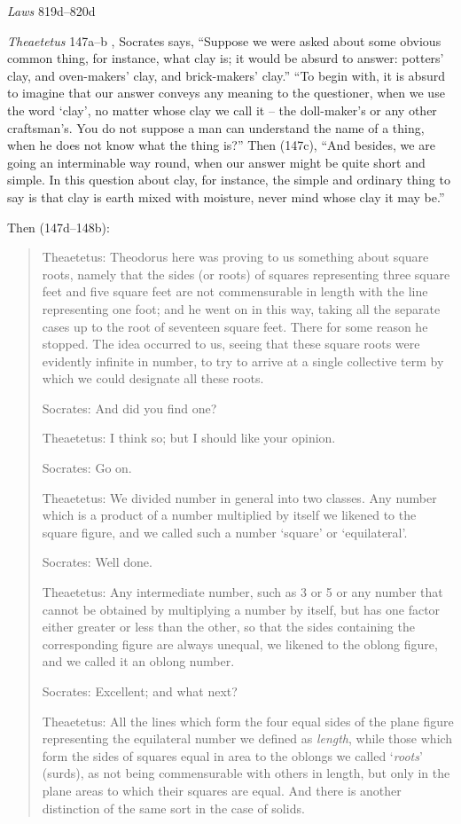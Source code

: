 \documentclass{article}
\theoremstyle{definition}
\begin{document}
{\em Laws} 819d--820d


{\em Theaetetus} 147a--b \cite[p.~22]{theaetetus}, Socrates says, ``Suppose we were asked about some obvious common thing, for instance, what clay is; it would be absurd to answer: potters' clay, and
oven-makers' clay, and brick-makers' clay.'' ``To begin with, it is absurd to imagine that our  answer conveys any meaning to the questioner, when we use the word
`clay', no matter whose clay we call it --  the doll-maker's or any other craftsman's. You do not suppose a man can understand the name of a thing, when he does not
know what the thing is?'' Then (147c), ``And besides, we are going an interminable way round, when our answer might be quite short and simple. In this question about clay,
for instance, the simple and ordinary thing to say is that clay is earth mixed with moisture, never mind whose clay it may be.''

Then  (147d--148b):

\begin{quote}
Theaetetus: Theodorus here was proving to us something about square roots, namely that the sides (or roots) of squares representing three square feet and five square feet
are not commensurable in length with the line representing one foot; and he went on in this way, taking all the separate cases up to the root of seventeen square feet. There for
some reason he stopped. The idea occurred to us, seeing that these square roots were evidently infinite in number, to try to arrive at a single collective term by which we could
designate all these roots.

Socrates: And did you find one?

Theaetetus: I think so; but I should like your opinion.

Socrates: Go on.

Theaetetus: We divided number in general into two classes. Any number which is a product of a number multiplied by itself we likened to the square figure, and we called
such a number `square' or `equilateral'.

Socrates: Well done.

Theaetetus: Any intermediate number, such as 3 or 5 or any number that cannot be obtained by multiplying a number by itself, but has one factor either greater
or less than the other, so that the sides containing the corresponding figure are always unequal, we likened to the oblong figure, and we called it an oblong number.

Socrates: Excellent; and what next?

Theaetetus: All the lines which form the four equal sides of the plane figure representing the equilateral number we defined as {\em length}, while those
which form the sides of squares equal in area to the oblongs we called `{\em roots}' (surds), as not being commensurable with others in length, but only in the
plane areas to which their squares are equal. And there is another distinction of the same sort in the case of solids.
\end{quote}
\end{document}
